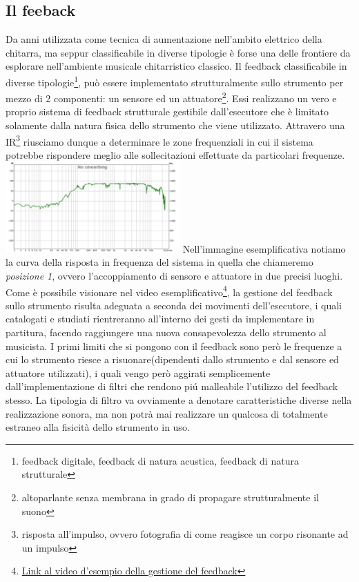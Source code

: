 \documentclass[oneside]{article}
\begin{document}
\begin{multicols*}{2}
\subsection{Il feeback} 
Da anni utilizzata come tecnica di aumentazione nell'ambito elettrico della chitarra, ma seppur classificabile in diverse tipologie è forse una delle frontiere da esplorare nell'ambiente musicale chitarristico classico. Il feedback classificabile in diverse tipologie\footnote{feedback digitale, feedback di natura acustica, feedback di natura strutturale}, può essere implementato strutturalmente sullo strumento per mezzo di 2 componenti: un sensore ed un attuatore\footnote{altoparlante senza membrana in grado di propagare strutturalmente il suono}. Essi realizzano un vero e proprio sistema di feedback strutturale gestibile dall'esecutore che è limitato solamente dalla natura fisica dello strumento che viene utilizzato. Attravero una IR\footnote{risposta all’impulso, ovvero fotografia di come reagisce un corpo risonante ad un impulso} riusciamo dunque a determinare le zone frequenziali in cui il sistema potrebbe rispondere meglio alle sollecitazioni effettuate da particolari frequenze.
\includegraphics[width=0.5\textwidth]{img/ir.png}
Nell'immagine esemplificativa notiamo la curva della risposta in frequenza del sistema in quella che chiameremo \textit{posizione 1}, ovvero l'accoppiamento di sensore e attuatore in due precisi luoghi. Come è possibile visionare nel video esemplificativo\footnote{\href{https://www.youtube.com/watch?v=7BwwTopM3Ek}{Link al video d'esempio della gestione del feedback}}, la gestione del feedback sullo strumento risulta adeguata a seconda dei movimenti dell'esecutore, i quali catalogati e studiati rientreranno all'interno dei gesti da implementare in partitura, facendo raggiungere una nuova consapevolezza dello strumento al musicista. I primi limiti che si pongono con il feedback sono però le frequenze a cui lo strumento riesce a risuonare(dipendenti dallo strumento e dal sensore ed attuatore utilizzati), i quali vengo però aggirati semplicemente dall'implementazione di filtri che rendono piú malleabile l'utilizzo del feedback stesso. La tipologia di filtro va ovviamente a denotare caratteristiche diverse nella realizzazione sonora, ma non potrà mai realizzare un qualcosa di totalmente estraneo alla fisicità dello strumento in uso.


\end{multicols*}
\end{document}
